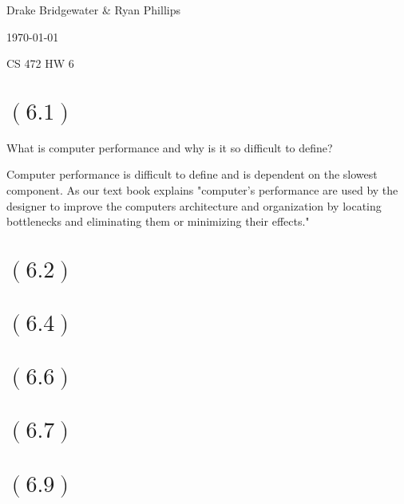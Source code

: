 \documentclass[letterpaper,12pt,titlepage]{article}
\def\name{Drake Bridgewater \& Ryan Phillips}
\begin{document}
\hfill \name

\hfill \today

\hfill CS 472 HW 6

\section*{$(6.1)$} What is computer performance and why is it so difficult to define?

\begin{mdframed}[style=MyFrame]
Computer performance is difficult to define and is dependent on the slowest component. As our text book explains "computer's performance are used by the designer to improve the computers architecture and organization by locating bottlenecks and eliminating them or minimizing their effects." \cite{Clements}
\end{mdframed}
\section*{$(6.2)$} 

\begin{mdframed}[style=MyFrame]
\end{mdframed}
\section*{$(6.4)$} 

\begin{mdframed}[style=MyFrame]
\end{mdframed}
\section*{$(6.6)$} 

\begin{mdframed}[style=MyFrame]
\end{mdframed}
\section*{$(6.7)$} 

\begin{mdframed}[style=MyFrame]
\end{mdframed}
\section*{$(6.9)$} 

\begin{mdframed}[style=MyFrame]
\end{mdframed}
\end{document}
